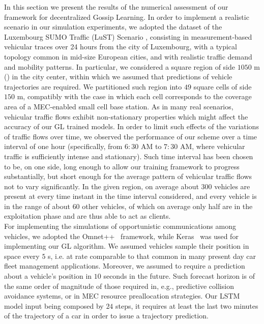 In this section we present the results of the numerical assessment of our framework for decentralized Gossip Learning.
In order to implement a realistic scenario in our simulation experiments, we adopted the dataset of the Luxembourg
SUMO Traffic (LuST) Scenario \cite{lux}, consisting in measurement-based vehicular traces over 24 hours from the city of Luxembourg, with a typical topology common in mid-size European cities, and with realistic traffic demand and mobility patterns. In particular, we considered a square region of side $1050$ m () in the city center, within which we assumed that predictions of vehicle trajectories are required. We partitioned such region into $49$ square cells of side $150$ m, compatibly with the case in which each cell corresponds to the coverage area of a MEC-enabled small cell base station. As in many real scenarios, vehicular traffic flows exhibit non-stationary properties which might affect the accuracy of our GL trained models. In order to limit such effects of the variations of traffic flows over time, we observed the performance of our scheme over a time interval of one hour (specifically, from $6:30$ AM to $7:30$ AM, where vehicular traffic is sufficiently intense and stationary). Such time interval has been chosen to be, on one side, long enough to allow our training framework to progress substantially, but short enough for the average pattern of vehicular traffic flows not to vary significantly. In the given region, on average about $300$ vehicles are present at every time instant in the time interval considered, and every vehicle is in the range of about $60$ other vehicles, of which on average only half are in the exploitation phase and are thus able to act as clients.\\
For implementing the simulations of opportunistic communications among vehicles, we adopted the Omnet++~\cite{Varga2010} framework, while Keras~\cite{chollet2018deep} was used for implementing our GL algorithm. We assumed vehicles sample their position in space every $5$ s, i.e. at rate comparable to that common in many present day car fleet management applications. Moreover, we assumed to require a prediction about a vehicle's position in $10$ seconds in the future. Such forecast horizon is of the same order of magnitude of those required in, e.g., predictive collision avoidance systems, or in MEC resource preallocation strategies. Our LSTM model input being composed by $24$ steps, it requires at least the last two minutes of the trajectory of a car in order to issue a trajectory prediction. 

